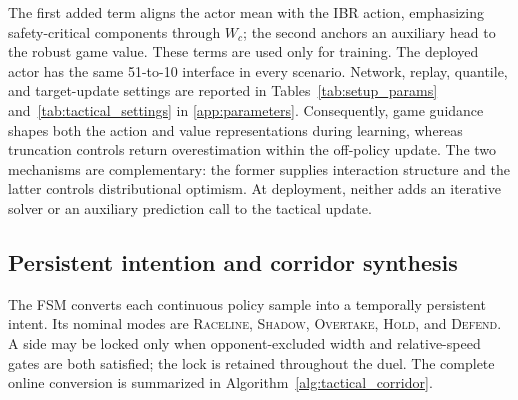 The first added term aligns the actor mean with the IBR action, emphasizing
safety-critical components through $W_c$; the second anchors an auxiliary
head to the robust game value.  These terms are used only for training.  The
deployed actor has the same 51-to-10 interface in every scenario.  Network,
replay, quantile, and target-update settings are reported in
Tables~\ref{tab:setup_params} and~\ref{tab:tactical_settings} in
\ref{app:parameters}.
Consequently, game guidance shapes both the action and value representations
during learning, whereas truncation controls return overestimation within the
off-policy update.  The two mechanisms are complementary: the former supplies
interaction structure and the latter controls distributional optimism.  At
deployment, neither adds an iterative solver or an auxiliary prediction call
to the tactical update.

\subsection{Persistent intention and corridor synthesis}
\label{subsec:corridor_synthesis}

The FSM converts each continuous policy sample into a temporally persistent
intent.  Its nominal modes are \textsc{Raceline}, \textsc{Shadow},
\textsc{Overtake}, \textsc{Hold}, and \textsc{Defend}.  A side may be locked
only when opponent-excluded width and relative-speed gates are both satisfied;
the lock is retained throughout the duel.  The complete online conversion is
summarized in Algorithm~\ref{alg:tactical_corridor}.

